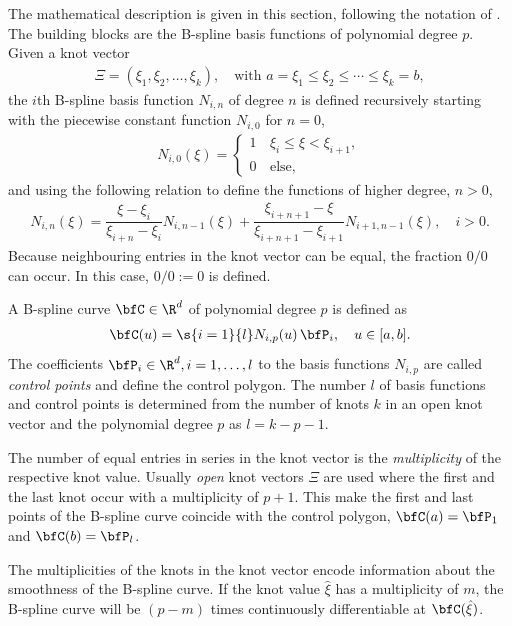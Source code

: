 The mathematical description is given in this section, following the notation of \cite{piegl2012nurbs}. The building blocks are the B-spline basis functions of polynomial degree $p$. Given a knot vector 
%
\begin{align*}
  \Xi = (\xi_1, \xi_2, \dots, \xi_k), \quad \text{with } a=\xi_1 \leq \xi_2 \leq \cdots \leq \xi_k = b,
\end{align*}
%
the $i$th B-spline basis function $N_{i,n}$ of degree $n$ is defined recursively starting with the piecewise constant function $N_{i,0}$ for $n=0$,
%
\begin{align*}
  N_{i,0}(\xi) = \begin{cases} 
    1 \, &\xi_i \leq \xi < \xi_{i+1},\\[2mm]
    0 &\text{else},
  \end{cases}
\end{align*}
and using the following relation to define the functions of higher degree, $n > 0$,
\begin{align*}
  N_{i,n}(\xi) = \dfrac{\xi - \xi_i}{\xi_{i+n} - \xi_i} N_{i,n-1}(\xi) + \dfrac{\xi_{i+n+1} - \xi}{\xi_{i+n+1} - \xi_{i+1}} N_{i+1,n-1}(\xi), \quad i > 0.
\end{align*}
Because neighbouring entries in the knot vector can be equal, the fraction $0/0$ can occur. In this case, $0/0 := 0$ is defined.

A B-spline curve $\bfC \in \R^d$ of polynomial degree $p$ is defined as
%
\begin{align*}
  \bfC(u) = \s{i=1}{l}N_{i,p}(u)\,\bfP_i, \quad u \in [a,b].
\end{align*}
%
The coefficients $\bfP_i \in \R^d, i=1, \dots, l$ to the basis functions $N_{i,p}$ are called \emph{control points} and define the control polygon. The number $l$ of basis functions and control points is determined from the number of knots $k$ in an open knot vector and the polynomial degree $p$ as $l = k-p-1$.

The number of equal entries in series in the knot vector is the \emph{multiplicity} of the respective knot value. Usually \emph{open} knot vectors $\Xi$ are used where the first and the last knot occur with a multiplicity of $p+1$.
This make the first and last points of the B-spline curve coincide with the control polygon, $\bfC(a) = \bfP_1$ and $\bfC(b) = \bfP_l$.

The multiplicities of the knots in the knot vector encode information about the smoothness of the B-spline curve. If the knot value $\hat{\xi}$ has a multiplicity of $m$, the B-spline curve will be $(p-m)$ times continuously differentiable at $\bfC(\hat{\xi})$.

